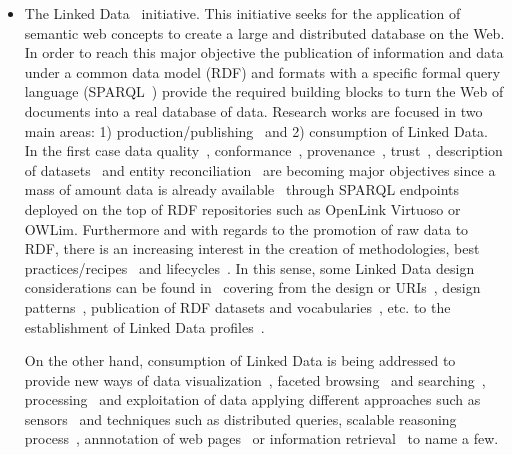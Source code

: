 \begin{itemize}
 \item The Linked Data~\cite{Berners-Lee-2006,Heath_Bizer_2011} initiative. This initiative seeks for the application of semantic web concepts to 
 create a large and distributed database on the Web. In order to reach this major objective the publication 
 of information and data under a common data model (RDF) and formats with a specific formal 
 query language (SPARQL~\cite{Sparql11}) provide the required building blocks to turn the Web of documents 
 into a real database of data. Research works are focused in two main areas: 1) production/publishing~\cite{bizer07how} and 2) consumption of 
 Linked Data. In the first case data quality~\cite{bizer2007,wiqa,ld-quality,DBLP:journals/ws/BizerC09,lodq,link-qa}, conformance~\cite{DBLP:journals/ws/HoganUHCPD12}, 
 provenance~\cite{w3c-prov,DBLP:conf/ipaw/HartigZ10}, trust~\cite{Carroll05namedgraphs}, description of datasets~\cite{void,Cyganiak08semanticsitemaps,ckanValidator} and 
 entity reconciliation~\cite{Serimi,Maali_Cyganiak_2011} are becoming major objectives since a mass of amount data is already available~\cite{Triplify} 
 through SPARQL endpoints deployed on the top of RDF repositories such as OpenLink Virtuoso or OWLim. Furthermore and with regards to the promotion of 
 raw data to RDF, there is an increasing interest in the creation of methodologies, best practices/recipes~\cite{best-gld,linked-data-cookbook} and lifecycles~\cite{gld-lifecycle,lod2-stack}. In this sense, some 
 Linked Data design considerations can be found in~\cite{bizer07how} covering from the design or URIs~\cite{Sauermann+2007a,bernerslee1998uri,uris-uk}, design patterns~\cite{linked-data-patterns}, 
 publication of RDF datasets and vocabularies~\cite{Berr08}, etc. to the establishment of Linked Data profiles~\cite{basic-profile-w3c}.
 
 On the other hand, consumption of Linked Data is being addressed to provide new ways of data visualization~\cite{DBLP:journals/semweb/DadzieR11,hoga-etal-2011-swse-JWS}, 
 faceted browsing~\cite{Pietriga06fresnel, citeulike:8529753,Sparallax} and searching~\cite{hoga-etal-2011-swse-JWS}, processing~\cite{Harth:2011:SIP:1963192.1963318} and exploitation of data applying 
 different approaches such as sensors~\cite{Jeung:2010:EMM:1850003.1850235,ontology-search} and techniques such as distributed queries\cite{Hartig09executingsparql,Ankolekar07thetwo,sparqlOpt}, 
 scalable reasoning process~\cite{Urbani2010WebPIE,HoganHarthPolleres2009,DBLP:conf/semweb/HoganPPD10}, 
 annnotation of web pages~\cite{rdfa-primer} or information retrieval~\cite{Pound} to name a few.
  

\end{itemize}
